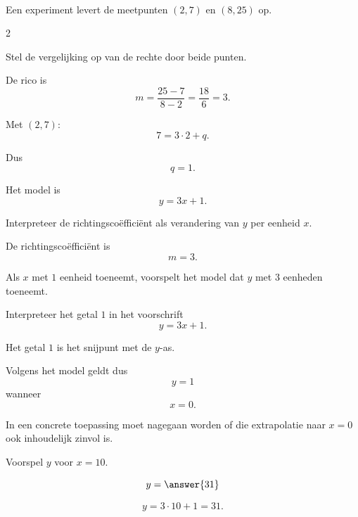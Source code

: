 \documentclass{ximera}
\begin{document}
\begin{oefening}{\oefU\ESS}
\\

Een experiment levert de meetpunten $(2,7)$ en $(8,25)$ op.

\begin{multicols}{2}

\begin{question}
Stel de vergelijking op van de rechte door beide punten.

\begin{oplossing}
De rico is
\[
m=\frac{25-7}{8-2}
=\frac{18}{6}
=3.
\]

Met $(2,7)$:
\[
7=3\cdot2+q.
\]

Dus
\[
q=1.
\]

Het model is
\[
\boxed{y=3x+1}.
\]
\end{oplossing}
\end{question}


\begin{question}
Interpreteer de richtingscoëfficiënt als verandering van $y$ per eenheid $x$.

\begin{oplossing}
De richtingscoëfficiënt is
\[
m=3.
\]

Als $x$ met $1$ eenheid toeneemt, voorspelt het model dat $y$ met $3$ eenheden toeneemt.
\end{oplossing}
\end{question}


\begin{question}
Interpreteer het getal $1$ in het voorschrift
\[
y=3x+1.
\]

\begin{oplossing}
Het getal $1$ is het snijpunt met de $y$-as.

Volgens het model geldt dus
\[
y=1
\]
wanneer
\[
x=0.
\]

In een concrete toepassing moet nagegaan worden of die extrapolatie naar $x=0$ ook inhoudelijk zinvol is.
\end{oplossing}
\end{question}


\begin{question}
Voorspel $y$ voor $x=10$.

\[
y=\answer{31}
\]

\begin{oplossing}
\[
y=3\cdot10+1
=31.
\]
\end{oplossing}
\end{question}



\end{multicols}
\end{oefening}
\end{document}
